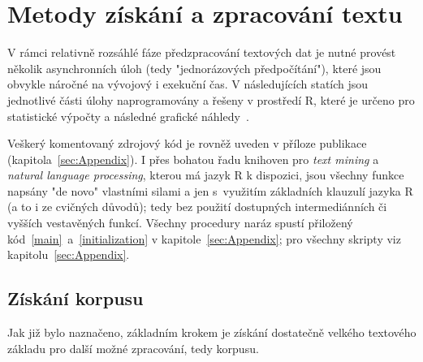 
\section{Metody získání a zpracování textu}

V rámci relativně rozsáhlé fáze předzpracování%
textových dat
je nutné provést několik asynchronních úloh (tedy "jednorázových
předpočítání"), které jsou obvykle náročné na vývojový i exekuční čas.
V následujících statích jsou jednotlivé části úlohy naprogramovány a řešeny
v prostředí \textsf{R}, které je určeno pro statistické výpočty a následné
grafické náhledy~\cite{Rlanguage}.



Veškerý komentovaný zdrojový kód je rovněž uveden v příloze publikace (kapitola~\ref{sec:Appendix}).
I přes bohatou řadu knihoven pro \textit{text mining} a \textit{natural
language processing}, kterou má jazyk
\textsf{R} k dispozici, jsou všechny
funkce napsány "de novo" vlastními silami a jen s~využitím základních klauzulí
jazyka \textsf{R} (a to i ze cvičných důvodů); tedy bez
použití dostupných
intermediánních či vyšších vestavěných funkcí. Všechny procedury naráz spustí
přiložený kód~\ref{main}~a~\ref{initialization} v kapitole~\ref{sec:Appendix};
pro všechny skripty viz kapitolu~\ref{sec:Appendix}.


\subsection{Získání korpusu}

Jak již bylo naznačeno, základním krokem je získání dostatečně velkého
textového základu pro další možné zpracování, tedy korpusu.

